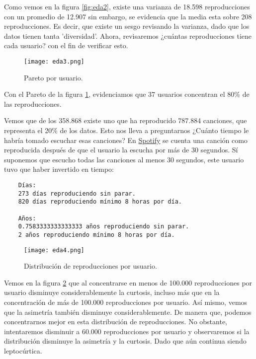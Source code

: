 \documentclass{article}
\begin{document}
Como vemos en la figura \ref{fig:eda2}, existe una varianza de 18.598 reproducciones con un promedio de 12.907 sin embargo, se evidencia que la media esta sobre 208 reproducciones. Es decir, que existe un sesgo revisando la varianza, dado que los datos tienen tanta 'diversidad'. Ahora, revisaremos ¿cuántas reproducciones tiene cada usuario? con el fin de verificar esto.

\begin{figure}[h]
    \centering
	\texttt{[image: eda3.png]}
    \caption{Pareto por usuario.}
    \label{fig:eda3}
\end{figure}

Con el Pareto de la figura \ref{fig:eda3}, evidenciamos que 37 usuarios concentran el 80\% de las reproducciones.

Vemos que de los 358.868 existe uno que ha reproducido 787.884 canciones, que representa el 20\% de los datos. Esto nos lleva a preguntarnos ¿Cuánto tiempo le habría tomado escuchar esas canciones?
En \href{https://community.spotify.com/t5/Accounts/When-and-how-does-Spotify-count-songs-as-quot-listened-to-quot/m-p/952243/highlight/true#M120586}{Spotify} se cuenta una canción como reproducida después de que el usuario la escucha por más de 30 segundos. Sí suponemos que escucho todas las canciones al menos 30 segundos, este usuario tuvo que haber invertido en tiempo:

\begin{verbatim}
    Días:
    273 días reproduciendo sin parar.
    820 días reproduciendo mínimo 8 horas por día.
    
    Años:
    0.7583333333333333 años reproduciendo sin parar.
    2 años reproduciendo mínimo 8 horas por día.
\end{verbatim}

\begin{figure}[h]
    \centering
	\texttt{[image: eda4.png]}
    \caption{Distribución de reproducciones por usuario.}
    \label{fig:eda4}
\end{figure}

Vemos en la figura \ref{fig:eda4} que al concentrarse en menos de 100.000 reproducciones por usuario disminuye considerablemente la curtosis, incluso más que en la concentración de más de 100.000 reproducciones por usuario. Así mismo, vemos que la asimetría también disminuye considerablemente. De manera que, podemos concentrarnos mejor en esta distribución de reproducciones. No obstante, intentaremos disminuir a 60.000 reproducciones por usuario y observaremos si la distribución disminuye la asimetría y la curtosis. Dado que aún continua siendo leptocúrtica.
\end{document}
